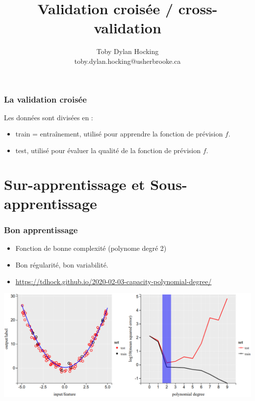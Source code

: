 \documentclass{beamer}
\begin{document}
\title{Validation croisée / cross-validation}

\author{
  Toby Dylan Hocking\\
  toby.dylan.hocking@usherbrooke.ca\\
}

\maketitle

\begin{frame}
  \frametitle{La validation croisée}
  Les données sont divisées en :
  \begin{itemize}
  \item train = entraînement, utilisé pour apprendre la fonction de prévision $f$.
  \item test, utilisé pour évaluer la qualité de la fonction de prévision $f$.
  \end{itemize}
\end{frame}

\section{Sur-apprentissage et Sous-apprentissage}

\begin{frame}
  \frametitle{Bon apprentissage}
  \begin{itemize}
  \item Fonction de bonne complexité (polynome degré 2)
  \item Bon régularité, bon variabilité.
  \item \tiny \url{https://tdhock.github.io/2020-02-03-capacity-polynomial-degree/}
  \end{itemize}
  \includegraphics[width=\textwidth]{poly-good}
\end{frame}
\end{document}

